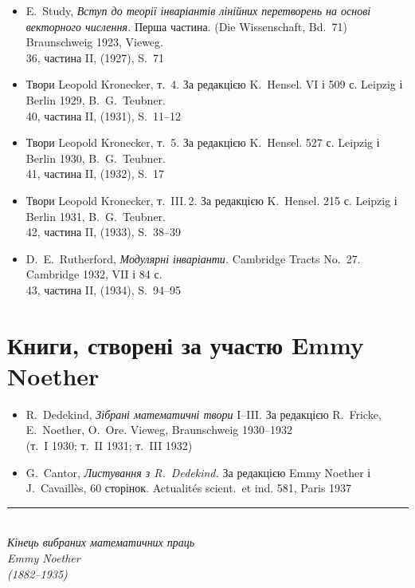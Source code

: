 \documentclass[11pt]{article}
\newcommand{\foreign}[1]{#1}
\begin{document}
\begin{itemize}[leftmargin=1.5em,itemsep=0.2em]
\item E.\ Study, \textit{Вступ до теорії інваріантів лінійних перетворень на основі векторного числення.} Перша частина. (\foreign{Die Wissenschaft}, Bd.~71) Braunschweig 1923, Vieweg.\\
36, частина II, (1927), S.~71

\item Твори Leopold Kronecker, т.~4. За редакцією K.\ Hensel. VI і 509 с. Leipzig і Berlin 1929, B.\ G.\ Teubner.\\
40, частина II, (1931), S.~11--12

\item Твори Leopold Kronecker, т.~5. За редакцією K.\ Hensel. 527 с. Leipzig і Berlin 1930, B.\ G.\ Teubner.\\
41, частина II, (1932), S.~17

\item Твори Leopold Kronecker, т.~III.\,2. За редакцією K.\ Hensel. 215 с. Leipzig і Berlin 1931, B.\ G.\ Teubner.\\
42, частина II, (1933), S.~38--39

\item D.\ E.\ Rutherford, \textit{Модулярні інваріанти.} \foreign{Cambridge Tracts No.~27.} Cambridge 1932, VII і 84 с.\\
43, частина II, (1934), S.~94--95
\end{itemize}

\newpage
\section*{Книги, створені за участю Emmy Noether}

\begin{itemize}[leftmargin=1.5em,itemsep=0.5em]
\item R.\ Dedekind, \textit{Зібрані математичні твори} I--III. За редакцією R.\ Fricke, E.\ Noether, O.\ Ore. Vieweg, Braunschweig 1930--1932\\
(т.~I 1930; т.~II 1931; т.~III 1932)

\item G.\ Cantor, \textit{Листування з R.\ Dedekind.} За редакцією Emmy Noether і J.\ Cavaillès, 60 сторінок. \foreign{Actualités scient.\ et ind.} 581, Paris 1937
\end{itemize}

\vfill

\begin{center}
\rule{0.5\textwidth}{0.4pt}\\[1em]
\textit{Кінець вибраних математичних праць}\\[0.5em]
\textit{Emmy Noether}\\[0.5em]
\textit{(1882--1935)}
\end{center}
\end{document}
